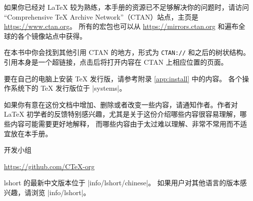 \bigskip
如果你已经对 \LaTeX{} 较为熟练，本手册的资源已不足够解决你的问题时，请访问
“Comprehensive \TeX{} Archive Network”（CTAN）站点，主页是 \url{https://www.ctan.org}。
所有的宏包也可以从 \url{https://mirrors.ctan.org} 和遍布全球的各个镜像站点中获得。

在本书中你会找到其他引用 CTAN 的地方，形式为 \texttt{CTAN://} 和之后的树状结构。
引用本身是一个超链接，点击后将打开内容在 CTAN 上相应位置的页面。

要在自己的电脑上安装 \TeX{} 发行版，请参考附录 \ref{app:install} 中的内容。
各个操作系统下的 \TeX{} 发行版位于 \CTAN|systems|。

\bigskip
如果你有意在这份文档中增加、删除或者改变一些内容，请通知作者。作者对 \LaTeX{}
初学者的反馈特别感兴趣，尤其是关于这份介绍哪些内容很容易理解，哪些内容可能需要更好地解释，
而哪些内容由于太过难以理解、非常不常用而不适宜放在本手册。

\bigskip
\begin{flushright}
 开发小组\par
\url{https://github.com/CTeX-org}
\end{flushright}

\vfill

\noindent\begingroup\small lshort 的最新中文版本位于 \CTAN|info/lshort/chinese|。
如果用户对其他语言的版本感兴趣，请浏览 \CTAN|info/lshort|。\endgroup

\endinput
